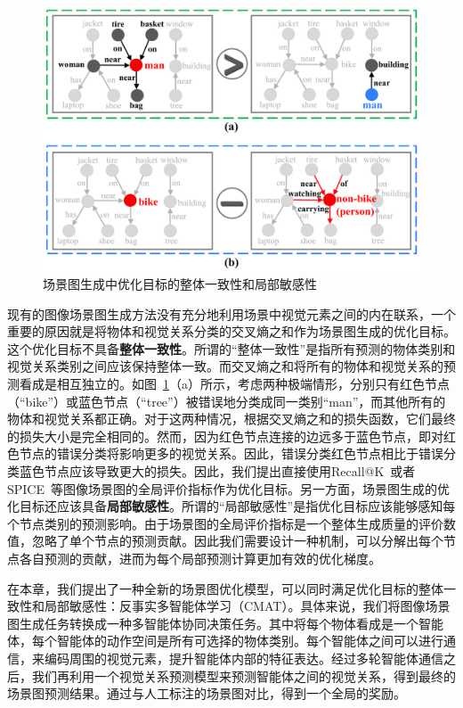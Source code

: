 \begin{figure}[t]
    \centering
    \includegraphics[width=0.95\linewidth]{chapter4/res/motivation.pdf}
    \caption{场景图生成中优化目标的整体一致性和局部敏感性}
    \label{ch4:fig:motivation}
\end{figure}

现有的图像场景图生成方法没有充分地利用场景中视觉元素之间的内在联系，一个重要的原因就是将物体和视觉关系分类的交叉熵之和作为场景图生成的优化目标。这个优化目标不具备\textbf{整体一致性}。所谓的“整体一致性”是指所有预测的物体类别和视觉关系类别之间应该保持整体一致。而交叉熵之和将所有的物体和视觉关系的预测看成是相互独立的。如图~\ref{ch4:fig:motivation}（a）所示，考虑两种极端情形，分别只有红色节点（“bike”）或蓝色节点（“tree”）被错误地分类成同一类别“man”，而其他所有的物体和视觉关系都正确。对于这两种情况，根据交叉熵之和的损失函数，它们最终的损失大小是完全相同的。然而，因为红色节点连接的边远多于蓝色节点，即对红色节点的错误分类将影响更多的视觉关系。因此，错误分类红色节点相比于错误分类蓝色节点应该导致更大的损失。因此，我们提出直接使用Recall@K~\cite{lu2016visual}或者SPICE~\cite{anderson2016spice}等图像场景图的全局评价指标作为优化目标。另一方面，场景图生成的优化目标还应该具备\textbf{局部敏感性}。所谓的“局部敏感性”是指优化目标应该能够感知每个节点类别的预测影响。由于场景图的全局评价指标是一个整体生成质量的评价数值，忽略了单个节点的预测贡献。因此我们需要设计一种机制，可以分解出每个节点各自预测的贡献，进而为每个局部预测计算更加有效的优化梯度。

在本章，我们提出了一种全新的场景图优化模型，可以同时满足优化目标的整体一致性和局部敏感性：反事实多智能体学习（CMAT）。具体来说，我们将图像场景图生成任务转换成一种多智能体协同决策任务。其中将每个物体看成是一个智能体，每个智能体的动作空间是所有可选择的物体类别。每个智能体之间可以进行通信，来编码周围的视觉元素，提升智能体内部的特征表达。经过多轮智能体通信之后，我们再利用一个视觉关系预测模型来预测智能体之间的视觉关系，得到最终的场景图预测结果。通过与人工标注的场景图对比，得到一个全局的奖励。

